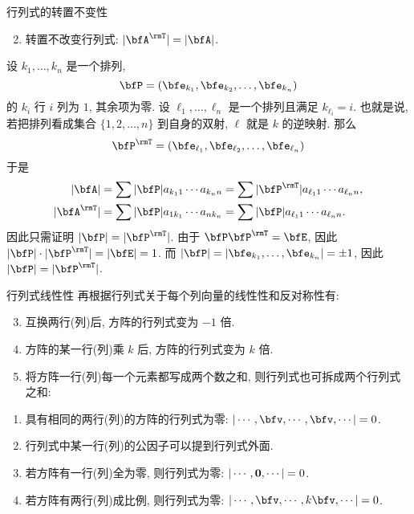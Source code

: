 \begin{frame}{行列式的转置不变性}
	\onslide<+->
	\begin{second@}
		\begin{enumerate}
			\setcounter{enumi}{1}
			\item 转置不改变行列式: $|\bfA^\rmT|=|\bfA|$.
		\end{enumerate}
	\end{second@}
	\onslide<+->
	设 $k_1,\dots,k_n$ 是一个排列,
	\[\bfP=(\bfe_{k_1},\bfe_{k_2},\dots,\bfe_{k_n})\]
	的 $k_i$ 行 $i$ 列为 $1$, 其余项为零.
	\onslide<+->
	设 $\ell_1,\dots,\ell_n$ 是一个排列且满足 $k_{\ell_i}=i$.
	\onslide<+->
	也就是说, 若把排列看成集合 $\{1,2,\dots,n\}$ 到自身的双射, $\ell$ 就是 $k$ 的逆映射.
	\onslide<+->
	那么
	\[\bfP^\rmT=(\bfe_{\ell_1},\bfe_{\ell_2},\dots,\bfe_{\ell_n})\]
	\onslide<+->
	于是
	\begin{align*}
		|\bfA|&=\sum|\bfP| a_{k_11}\cdots a_{k_nn}=\sum|\bfP^\rmT| a_{\ell_11}\cdots a_{\ell_nn},\\
		|\bfA^\rmT|&=\sum|\bfP| a_{1k_1}\cdots a_{nk_n}=\sum|\bfP| a_{\ell_11}\cdots a_{\ell_nn}.
	\end{align*}
	\onslide<+->
	因此只需证明 $|\bfP|=|\bfP^\rmT|$.
	\onslide<+->
	由于 $\bfP\bfP^\rmT=\bfE$, 因此 $|\bfP|\cdot|\bfP^\rmT|=|\bfE|=1$.
	\onslide<+->
	而 $|\bfP|=|\bfe_{k_1},\dots,\bfe_{k_n}|=\pm1$, 因此 $|\bfP|=|\bfP^\rmT|$.
\end{frame}


\begin{frame}{行列式线性性}
	\onslide<+->
	再根据行列式关于每个列向量的线性性和反对称性有:
	\onslide<+->
	\begin{second@}
		\begin{enumerate}
			\setcounter{enumi}{2}
			\item 互换两行(列)后, 方阵的行列式变为 $-1$ 倍.
			\item 方阵的某一行(列)乘 $k$ 后, 方阵的行列式变为 $k$ 倍.
			\item 将方阵一行(列)每一个元素都写成两个数之和, 则行列式也可拆成两个行列式之和:
		\end{enumerate}
	\end{second@}
	\onslide<+->
	\begin{corollary}
		\begin{enumerate}
			\item 具有相同的两行(列)的方阵的行列式为零: $|\cdots,\bfv,\cdots,\bfv,\cdots|=0$.
			\item 行列式中某一行(列)的公因子可以提到行列式外面.
			\item 若方阵有一行(列)全为零, 则行列式为零: $|\cdots,{\bf0},\cdots|=0$.
			\item 若方阵有两行(列)成比例, 则行列式为零: $|\cdots,\bfv,\cdots,k\bfv,\cdots|=0$.
		\end{enumerate}
	\end{corollary}
\end{frame}


